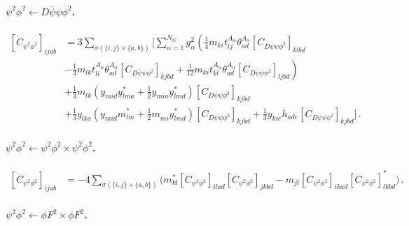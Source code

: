\paragraph{\texorpdfstring{$\psi^2 \phi^2 \leftarrow D\overline\psi\psi\phi^2$}{psi2phi2fromDpsibarpsiphi2}.}

\begin{align}
    \left[\dot C_{\psi^2\phi^2}\right]_{ijab} &= 3\sum_{\sigma(\{i,j\}\times\{a,b\})}  \Bigg[\sum_{\alpha=1}^{N_G} g_\alpha^2 \left(\frac{1}{4} m_{ki} t_{lj}^{A_\alpha} \theta_{ad}^{A_\alpha} \left[C_{D\overline\psi\psi\phi^2}\right]_{klbd}\right.\nonumber\\
    &\left. - \frac{1}{3} m_{lk}t_{li}^{A_\alpha} \theta_{ad}^{A_\alpha} \left[C_{D\overline\psi\psi\phi^2}\right]_{kjbd}+ \frac{1}{12} m_{ki}t_{kl}^{A_\alpha} \theta_{ad}^{A_\alpha} \left[C_{D\overline\psi\psi\phi^2}\right]_{ljbd}\right)\nonumber\\
    &+ \frac{1}{3} m_{lk}^{\phantom *} \left( y_{mid}^{\phantom *} y_{lma}^* +\frac{1}{2}y_{mia}^{\phantom *} y_{lmd}^* \right)  \left[C_{D\overline\psi\psi\phi^2}\right]_{kjbd}\label{psi2phi2_Dbarpsipsiphi2}\\
    &+ \frac{1}{3} y_{lka}^{\phantom *} \left( y_{mid}^{\phantom *} m_{lm}^* +\frac{1}{2}m_{mi}^{\phantom *} y_{lmd}^* \right)  \left[C_{D\overline\psi\psi\phi^2}\right]_{kjbd}
    +\frac{1}{3} y_{kie} h_{ade} \left[C_{D\overline\psi\psi\phi^2}\right]_{kjbd}\Bigg]\nonumber\,.
\end{align}

\paragraph{\texorpdfstring{$\psi^2 \phi^2 \leftarrow \psi^2\phi^2\times\psi^2\phi^2$}{psi2phi2frompsi2phi2xpsi2phi2}.}

\begin{align}
    \left[\dot C_{\psi^2\phi^2}\right]_{ijab} &= -4\sum_{\sigma(\{i,j\}\times\{a,b\})}
    \bigg(
    m_{kl}^* \left[C_{\psi^2\phi^2}\right]_{ilad} \left[C_{\psi^2\phi^2}\right]_{jkbd}- 
    m_{jl} \left[C_{\psi^2\phi^2}\right]_{ikad} \left[C_{\psi^2\phi^2}\right]_{lkbd}^*
    \bigg)\,.\label{psi2phi2_psi2phi2xpsi2phi2}
\end{align}

\paragraph{$\psi^2\phi^2 \leftarrow \phi F^2 \times \phi F^2$.}

